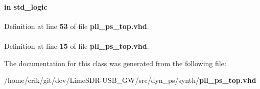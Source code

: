 \paragraph[{smpl\+\_\+cmp\+\_\+error}]{ {\bfseries \textcolor{keywordflow}{in}\textcolor{vhdlchar}{ }} {\bfseries \textcolor{comment}{std\+\_\+logic}\textcolor{vhdlchar}{ }} \hspace{0.3cm}{\ttfamily [Port]}}\label{classpll__ps__top_ab89caaf9e342c725af6f87ac27d615ef}


Definition at line {\bf 53} of file {\bf pll\+\_\+ps\+\_\+top.\+vhd}.

\paragraph[{std\+\_\+logic\+\_\+1164}]{\hspace{0.3cm}{\ttfamily [Package]}}\label{classpll__ps__top_acd03516902501cd1c7296a98e22c6fcb}


Definition at line {\bf 15} of file {\bf pll\+\_\+ps\+\_\+top.\+vhd}.



The documentation for this class was generated from the following file\+:\begin{DoxyCompactItemize}
\item 
/home/erik/git/dev/\+Lime\+S\+D\+R-\/\+U\+S\+B\+\_\+\+G\+W/src/dyn\+\_\+ps/synth/{\bf pll\+\_\+ps\+\_\+top.\+vhd}\end{DoxyCompactItemize}
